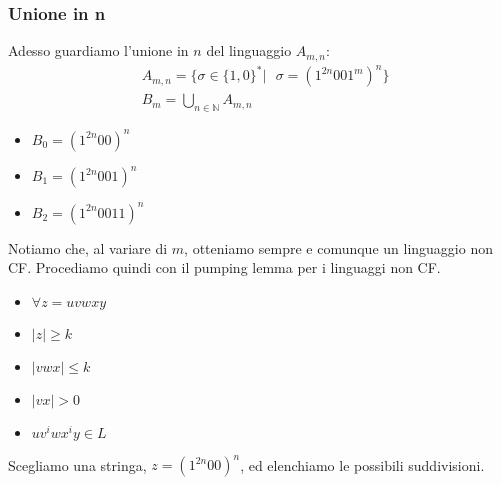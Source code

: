 \documentclass[a4paper,oneside]{scrbook}
\begin{document}
\subsubsection{Unione in n}
Adesso guardiamo l'unione in $n$ del linguaggio $A_{m,n}$:
\begin{align*}
    &A_{m,n}=\{ \sigma \in \{1,0\}^* | \text{ } \sigma = (1^{2n}001^m)^n \}\\
    &B_m = \bigcup_{n\in\mathbb{N}} A_{m,n}
\end{align*}
\begin{itemize}
	\item $B_0=(1^{2n}00)^n$
	\item $B_1=(1^{2n}001)^n$
	\item $B_2=(1^{2n}0011)^n$
\end{itemize}
Notiamo che, al variare di $m$, otteniamo sempre e comunque un linguaggio non CF.
Procediamo quindi con il pumping lemma per i linguaggi non CF.\\
\begin{itemize}
	\item $\forall z = uvwxy$
	\item $|z| \geq k$
	\item $|vwx| \leq k$
	\item $|vx|>0$
	\item $uv^iwx^iy\in L$
\end{itemize}
Scegliamo una stringa, $z=(1^{2n}00)^n$, ed elenchiamo le possibili suddivisioni.
\end{document}
